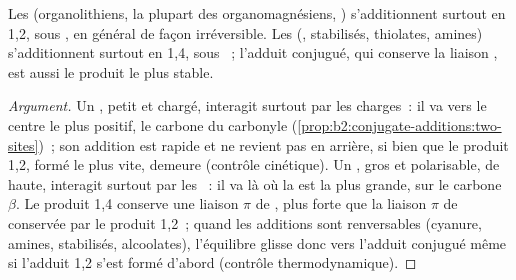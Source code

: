 \begin{proposition}\label{prop:b2:conjugate-additions:regio}
Les  (organolithiens, la plupart des organomagnésiens, ) s'additionnent
surtout en 1,2, sous , en général de façon irréversible. Les 
(,  stabilisés, thiolates, amines) s'additionnent surtout en 1,4, sous ~; l'adduit conjugué, qui conserve la liaison , est aussi le produit le plus stable.
\end{proposition}

\begin{proof}[Argument]
Un , petit et chargé, interagit surtout par les charges~: il va vers le centre le plus
positif, le carbone du carbonyle (\cref{prop:b2:conjugate-additions:two-sites})~; son addition est
rapide et ne revient pas en arrière, si bien que le produit 1,2, formé le plus vite, demeure (contrôle
cinétique). Un , gros et polarisable, de  haute, interagit surtout par les ~: il va là où la  est la plus grande, sur le carbone $\beta$. Le produit 1,4 conserve une
liaison $\pi$ de , plus forte que la liaison $\pi$ de
 conservée par le produit 1,2~; quand les additions sont renversables (cyanure, amines,
 stabilisés, alcoolates), l'équilibre glisse donc vers l'adduit conjugué même si l'adduit 1,2
s'est formé d'abord (contrôle thermodynamique).
\end{proof}


